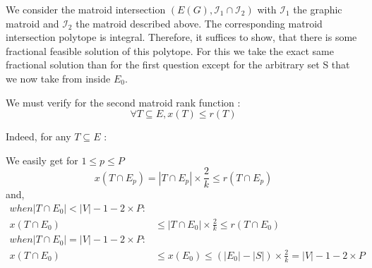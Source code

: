 \documentclass{scrartcl}
\newcommand\1{\mathbf{1}}
\begin{document}
\begin{enumerate}
We consider the matroid intersection $(E(G), \mathcal{I}_1\cap \mathcal{I}_2)$ with $\mathcal{I}_1$ the graphic matroid and $\mathcal{I}_2$ the matroid described above. The corresponding matroid intersection polytope is integral. Therefore, it suffices to show, that there is some fractional feasible solution of this polytope. For this we take the exact same fractional solution than for the first question except for the arbitrary set S that we now take from inside $E_0$.

We must verify for the second matroid rank function :
\[
\forall T \subseteq E, x(T) \leq r(T)
\]

Indeed, for any $T\subseteq E$ : 

We easily get for $1 \leq p \leq P$
\[ 
x(T\cap E_p) = |T\cap E_p| \times \frac{2}{k} \leq r(T\cap E_p)
\]
and,
\begin{align*}
when |T\cap E_0| < |V| - 1 - 2 \times P :&\\
x(T\cap E_0) & \leq |T\cap E_0| \times \frac{2}{k} \leq r(T\cap E_0)\\
when |T\cap E_0| = |V| - 1 - 2 \times P :&\\
x(T\cap E_0) & \leq x(E_0) \leq (|E_0| - |S|) \times \frac{2}{k} = |V| - 1 - 2 \times P\\
\end{align*}



\end{enumerate}
\end{document}
